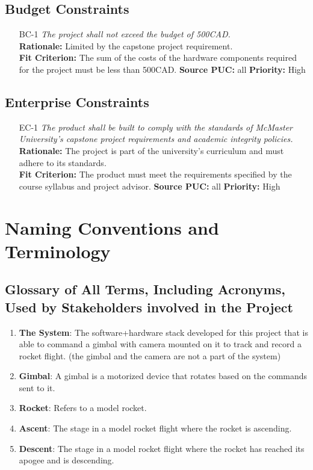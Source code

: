 \documentclass[12pt]{article}
\begin{document}
\subsection{Budget Constraints}

\begin{itemize}[leftmargin=*]
  \item[BC-1] \emph{The project shall not exceed the budget of 500CAD.}\\[2mm]
        \textbf{Rationale:} Limited by the capstone project requirement.\\
        \textbf{Fit Criterion:} The sum of the costs of the hardware components required for the project must be less than 500CAD.
        \textbf{Source PUC:} all
        \textbf{Priority:} High
\end{itemize}

\subsection{Enterprise Constraints}

\begin{itemize}[leftmargin=*]
  \item[EC-1] \emph{The product shall be built to comply with the standards of McMaster
          University's capstone project requirements and academic integrity policies.}\\[2mm]
        \textbf{Rationale:} The project is part of the university's curriculum and must adhere to its standards.\\
        \textbf{Fit Criterion:} The product must meet the requirements specified by the course syllabus and project advisor.
        \textbf{Source PUC:} all
        \textbf{Priority:} High
\end{itemize}

\section{Naming Conventions and Terminology}
\subsection{Glossary of All Terms, Including Acronyms, Used by Stakeholders
  involved in the Project}

\begin{enumerate}
  \item \textbf{The System}: The software+hardware stack developed for this project that is able to command a gimbal with camera mounted on it to track and record a rocket flight. (the gimbal and the camera are not a part of the system)
  \item \textbf{Gimbal}: A gimbal is a motorized device that rotates based on the commands sent to it.
  \item \textbf{Rocket}: Refers to a model rocket.
  \item \textbf{Ascent}: The stage in a model rocket flight where the rocket is ascending.
  \item \textbf{Descent}: The stage in a model rocket flight where the rocket has reached its apogee and is descending.
\end{enumerate}
\end{document}
